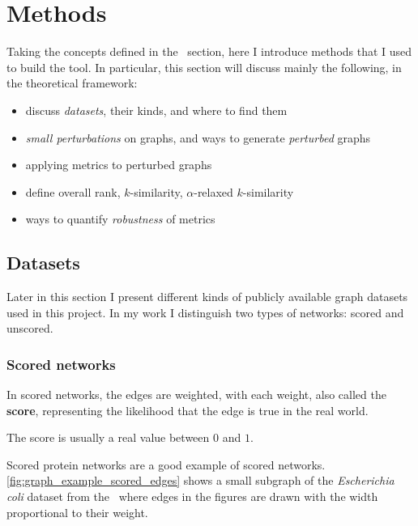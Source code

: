 \section{Methods}\label{sec:methods}

Taking the concepts defined in the~ section, here I introduce methods that I used to build the \graffs tool.
In particular, this section will discuss mainly the following, in the theoretical framework:
\begin{itemize}
    \item discuss \textsl{datasets}, their kinds, and where to find them
    \item \textsl{small perturbations} on graphs, and ways to generate \textsl{perturbed} graphs
    \item applying metrics to perturbed graphs
    \item define overall rank, $k$-similarity, $\alpha$-relaxed $k$-similarity
    \item ways to quantify \textsl{robustness} of metrics
\end{itemize}

\subsection{Datasets}\label{sec:datasets}

Later in this section I present different kinds of publicly available graph datasets used in this project.
In my work I distinguish two types of networks: scored and unscored.


\subsubsection{Scored networks}\label{sec:scored_networks}

In scored networks, the edges are weighted, with each weight, also called the \textbf{score}, representing the likelihood that the edge is true in the real world.

The score is usually a real value between $0$ and $1$.



Scored protein networks are a good example of scored networks.
\autoref{fig:graph_example_scored_edges} shows a small subgraph of the \textsl{Escherichia coli} dataset from the~ where edges in the figures are drawn with the width proportional to their weight.

